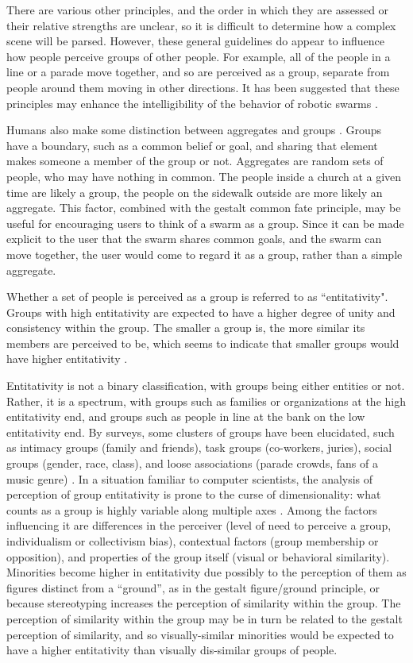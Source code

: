 There are various other principles, and the order in which they are assessed or their relative strengths are unclear, so it is difficult to determine how a complex scene will be parsed. 
However, these general guidelines do appear to influence how people perceive groups of other people. For example, all of the people in a line or a parade move together, and so are perceived as a group, separate from people around them moving in other directions.
It has been suggested that these principles may enhance the intelligibility of the behavior of robotic swarms \citep{nagavalli2018algorithms}. 

Humans also make some distinction between aggregates and groups \citep{wilder1978perceiving}.
Groups have a boundary, such as a common belief or goal, and sharing that element makes someone a member of the group or not. 
Aggregates are random sets of people, who may have nothing in common.
The people inside a church at a given time are likely a group, the people on the sidewalk outside are more likely an aggregate. 
This factor, combined with the gestalt common fate principle, may be useful for encouraging users to think of a swarm as a group. 
Since it can be made explicit to the user that the swarm shares common goals, and the swarm can move together, the user would come to regard it as a group, rather than a simple aggregate. 

Whether a set of people is perceived as a group is referred to as ``entitativity".
Groups with high entitativity are expected to have a higher degree of unity and consistency within the group. 
The smaller a group is, the more similar its members are perceived to be, which seems to indicate that smaller groups would have higher entitativity \citep{stewart2003trust}. 

Entitativity is not a binary classification, with groups being either entities or not. 
Rather, it is a spectrum, with groups such as families or organizations at the high entitativity end, and groups such as people in line at the bank on the low entitativity end. 
By surveys, some clusters of groups have been elucidated, such as intimacy groups (family and friends), task groups (co-workers, juries), social groups (gender, race, class), and loose associations (parade crowds, fans of a music genre) \citep{lickel2001elements}. 
In a situation familiar to computer scientists, the analysis of perception of group entitativity is prone to the curse of dimensionality: what counts as a group is highly variable along multiple axes \citep{lickel2000varieties}.  
Among the factors influencing it are differences in the perceiver (level of need to perceive a group, individualism or collectivism bias), contextual factors (group membership or opposition), and properties of the group itself (visual or behavioral similarity).
Minorities become higher in entitativity due possibly to the perception of them as figures distinct from a ``ground'', as in the gestalt figure/ground principle, or because stereotyping increases the perception of similarity within the group. 
The perception of similarity within the group may be in turn be related to the gestalt perception of similarity, and so visually-similar minorities would be expected to have a higher entitativity than visually dis-similar groups of people. 
	
